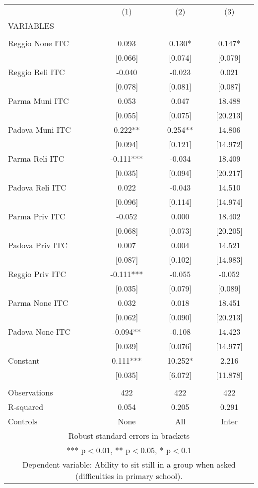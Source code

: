 \begin{tabular}{lccc} \hline
 & (1) & (2) & (3) \\
VARIABLES &  &  &  \\ \hline
 &  &  &  \\
Reggio None ITC & 0.093 & 0.130* & 0.147* \\
 & [0.066] & [0.074] & [0.079] \\
Reggio Reli ITC & -0.040 & -0.023 & 0.021 \\
 & [0.078] & [0.081] & [0.087] \\
Parma Muni ITC & 0.053 & 0.047 & 18.488 \\
 & [0.055] & [0.075] & [20.213] \\
Padova Muni ITC & 0.222** & 0.254** & 14.806 \\
 & [0.094] & [0.121] & [14.972] \\
Parma Reli ITC & -0.111*** & -0.034 & 18.409 \\
 & [0.035] & [0.094] & [20.217] \\
Padova Reli ITC & 0.022 & -0.043 & 14.510 \\
 & [0.096] & [0.114] & [14.974] \\
Parma Priv ITC & -0.052 & 0.000 & 18.402 \\
 & [0.068] & [0.073] & [20.205] \\
Padova Priv ITC & 0.007 & 0.004 & 14.521 \\
 & [0.087] & [0.102] & [14.983] \\
Reggio Priv ITC & -0.111*** & -0.055 & -0.052 \\
 & [0.035] & [0.079] & [0.089] \\
Parma None ITC & 0.032 & 0.018 & 18.451 \\
 & [0.062] & [0.090] & [20.213] \\
Padova None ITC & -0.094** & -0.108 & 14.423 \\
 & [0.039] & [0.076] & [14.977] \\
Constant & 0.111*** & 10.252* & 2.216 \\
 & [0.035] & [6.072] & [11.878] \\
 &  &  &  \\
Observations & 422 & 422 & 422 \\
R-squared & 0.054 & 0.205 & 0.291 \\
 Controls & None & All & Inter \\ \hline
\multicolumn{4}{c}{ Robust standard errors in brackets} \\
\multicolumn{4}{c}{ *** p$<$0.01, ** p$<$0.05, * p$<$0.1} \\
\multicolumn{4}{c}{ Dependent variable: Ability to sit still in a group when asked (difficulties in primary school).} \\
\end{tabular}
